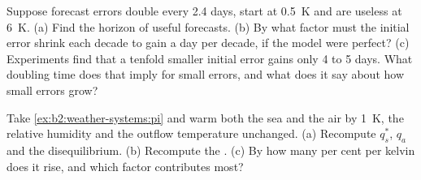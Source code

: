 \begin{exercise}[$\star\star\star$]\label{exo:b2:weather-systems:11}
Suppose forecast errors double every 2.4 days, start at \qty{0.5}{K} and are useless at
\qty{6}{K}. (a) Find the horizon of useful forecasts. (b) By what factor must the initial error
shrink each decade to gain a day per decade, if the model were perfect? (c) Experiments find that
a tenfold smaller initial error gains only 4 to 5 days. What doubling time does that imply for
small errors, and what does it say about how small errors grow?
\end{exercise}

\begin{exercise}[$\star\star\star$]\label{exo:b2:weather-systems:12}
Take \cref{ex:b2:weather-systems:pi} and warm both the sea and the air by \qty{1}{K}, the
relative humidity and the outflow temperature unchanged. (a) Recompute $q_s^*$, $q_a$ and the
disequilibrium. (b) Recompute the . (c) By how many per cent per kelvin does
it rise, and which factor contributes most?
\end{exercise}

